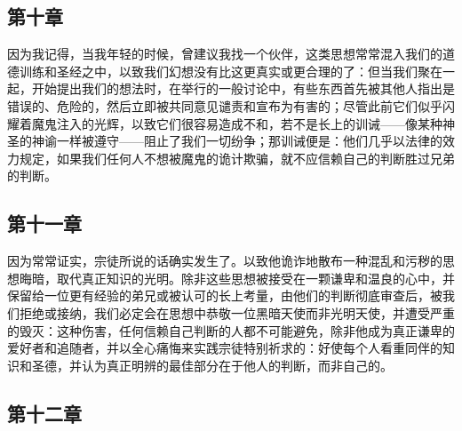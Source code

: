\subsection{第十章}

\par

因为我记得，当我年轻的时候，曾建议我找一个伙伴，这类思想常常混入我们的道德训练和圣经之中，以致我们幻想没有比这更真实或更合理的了：但当我们聚在一起，开始提出我们的想法时，在举行的一般讨论中，有些东西首先被其他人指出是错误的、危险的，然后立即被共同意见谴责和宣布为有害的；尽管此前它们似乎闪耀着魔鬼注入的光辉，以致它们很容易造成不和，若不是长上的训诫——像某种神圣的神谕一样被遵守——阻止了我们一切纷争；那训诫便是：他们几乎以法律的效力规定，如果我们任何人不想被魔鬼的诡计欺骗，就不应信赖自己的判断胜过兄弟的判断。\par


\subsection{第十一章}

\par

因为常常证实，宗徒所说的话确实发生了。以致他诡诈地散布一种混乱和污秽的思想晦暗，取代真正知识的光明。除非这些思想被接受在一颗谦卑和温良的心中，并保留给一位更有经验的弟兄或被认可的长上考量，由他们的判断彻底审查后，被我们拒绝或接纳，我们必定会在思想中恭敬一位黑暗天使而非光明天使，并遭受严重的毁灭：这种伤害，任何信赖自己判断的人都不可能避免，除非他成为真正谦卑的爱好者和追随者，并以全心痛悔来实践宗徒特别祈求的：好使每个人看重同伴的知识和圣德，并认为真正明辨的最佳部分在于他人的判断，而非自己的。\par


\subsection{第十二章}

